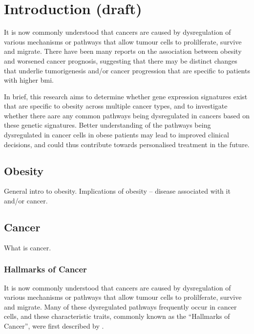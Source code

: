 \chapter{Introduction (draft)}
\label{ch:intro}


It is now commonly understood that cancers are caused by dysregulation of various mechanisms or pathways that allow tumour cells to prolilferate, survive and migrate.
There have been many reports on the association between obesity and worsened cancer prognosis, suggesting that there may be distinct changes that underlie tumorigenesis and/or cancer progression that are specific to patients with higher \gls{bmi}.

In brief, this research aims to determine whether gene expression signatures exist that are specific to obesity across multiple cancer types, and to investigate whether there aare any common pathways being dysregulated in cancers based on these genetic signatures.
Better understanding of the pathways being dysregulated in cancer cells in obese patients may lead to improved clinical decisions, and could thus contribute towards personalised treatment in the future.


\section{Obesity}
\label{sec:obesity}

General intro to obesity.
Implications of obesity -- disease associated with it and/or cancer.

\section{Cancer}
\label{sec:cancer}

What is cancer.

\subsection{Hallmarks of Cancer}
\label{subsec:cancerhallmarks}

It is now commonly understood that cancers are caused by dysregulation of various mechanisms or pathways that allow tumour cells to prolilferate, survive and migrate.
Many of these dysregulated pathways frequently occur in cancer cells, and these characteristic traits, commonly known as the ``Hallmarks of Cancer'', were first described by \citet{Hanahan2000}.

